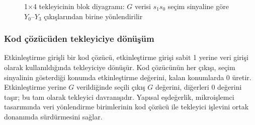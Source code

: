 \begin{figure}[H]
\centering
{}
\caption{1×4 tekleyicinin blok diyagramı: $G$ verisi $s_1 s_0$ seçim sinyaline göre $Y_0$--$Y_3$ çıkışlarından birine yönlendirilir}
\label{fig:B.demux-1to4}
\end{figure}

\subsubsection{Kod çözücüden tekleyiciye dönüşüm}
Etkinleştirme girişli bir kod çözücü, etkinleştirme girişi sabit 1 yerine veri girişi olarak kullanıldığında tekleyiciye dönüşür. Kod çözücünün her çıkışı, seçim sinyalinin gösterdiği konumda etkinleştirme değerini, kalan konumlarda 0 üretir. Etkinleştirme yerine $G$ verildiğinde seçili çıkış $G$ değerini, diğerleri 0 değerini taşır; bu tam olarak tekleyici davranışıdır. Yapısal eşdeğerlik, mikroişlemci tasarımında veri yönlendirme birimlerinin kod çözücü ile tekleyici işlevini ortak donanımda sürdürmesini sağlar.



